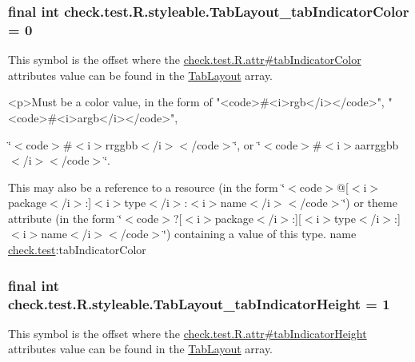 \subsubsection[{Tab\+Layout\+\_\+tab\+Indicator\+Color}]{\setlength{\rightskip}{0pt plus 5cm}final int check.\+test.\+R.\+styleable.\+Tab\+Layout\+\_\+tab\+Indicator\+Color = 0\hspace{0.3cm}{\ttfamily [static]}}\label{classcheck_1_1test_1_1_r_1_1styleable_abe4a618bcb92a95c54007a1a200f0279}
This symbol is the offset where the \hyperlink{classcheck_1_1test_1_1_r_1_1attr_a7c3852dcc199564747fe365fccae05f5}{check.\+test.\+R.\+attr\#tab\+Indicator\+Color} attribute\textquotesingle{}s value can be found in the \hyperlink{classcheck_1_1test_1_1_r_1_1styleable_a2a3232e8d38a43f5131a16385abbbed8}{Tab\+Layout} array.

\begin{DoxyVerb}      <p>Must be a color value, in the form of "<code>#<i>rgb</i></code>", "<code>#<i>argb</i></code>",
\end{DoxyVerb}
 \char`\"{}$<$code$>$\#$<$i$>$rrggbb$<$/i$>$$<$/code$>$\char`\"{}, or \char`\"{}$<$code$>$\#$<$i$>$aarrggbb$<$/i$>$$<$/code$>$\char`\"{}. 

This may also be a reference to a resource (in the form \char`\"{}$<$code$>$@\mbox{[}$<$i$>$package$<$/i$>$\+:\mbox{]}$<$i$>$type$<$/i$>$\+:$<$i$>$name$<$/i$>$$<$/code$>$\char`\"{}) or theme attribute (in the form \char`\"{}$<$code$>$?\mbox{[}$<$i$>$package$<$/i$>$\+:\mbox{]}\mbox{[}$<$i$>$type$<$/i$>$\+:\mbox{]}$<$i$>$name$<$/i$>$$<$/code$>$\char`\"{}) containing a value of this type.  name \hyperlink{namespacecheck_1_1test}{check.\+test}\+:tab\+Indicator\+Color \hypertarget{classcheck_1_1test_1_1_r_1_1styleable_aca78b1820fbcf57d71fd51391a7c0bf0}{}
\subsubsection[{Tab\+Layout\+\_\+tab\+Indicator\+Height}]{\setlength{\rightskip}{0pt plus 5cm}final int check.\+test.\+R.\+styleable.\+Tab\+Layout\+\_\+tab\+Indicator\+Height = 1\hspace{0.3cm}{\ttfamily [static]}}\label{classcheck_1_1test_1_1_r_1_1styleable_aca78b1820fbcf57d71fd51391a7c0bf0}
This symbol is the offset where the \hyperlink{classcheck_1_1test_1_1_r_1_1attr_a274b66d412bade0510cae3077354f9be}{check.\+test.\+R.\+attr\#tab\+Indicator\+Height} attribute\textquotesingle{}s value can be found in the \hyperlink{classcheck_1_1test_1_1_r_1_1styleable_a2a3232e8d38a43f5131a16385abbbed8}{Tab\+Layout} array.

